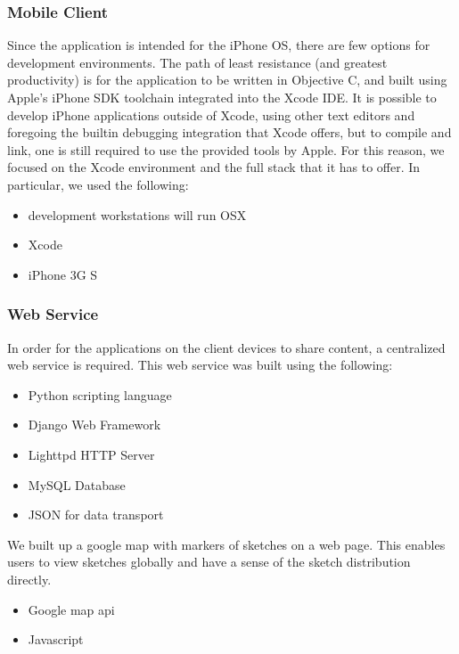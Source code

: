 \documentclass{chi2009}
\begin{document}
\subsubsection{Mobile Client}

Since the application is intended for the iPhone OS, there are few options for
development environments.  The path of least resistance (and greatest
productivity) is for the application to be written in Objective C, and built
using Apple's iPhone SDK toolchain integrated into the Xcode IDE.  It is
possible to develop iPhone applications outside of Xcode, using other text
editors and foregoing the builtin debugging integration that Xcode offers, but
to compile and link, one is still required to use the provided tools by Apple.
For this reason, we focused on the Xcode environment and the full
stack that it has to offer.  In particular, we used the following:

\begin{itemize}
\item development workstations will run OSX
\item Xcode
\item iPhone 3G S
\end{itemize}

\subsubsection{Web Service}

In order for the applications on the client devices to share content, a
centralized web service is required. This web service was built using the following:

\begin{itemize}
\item Python scripting language
\item Django Web Framework
\item Lighttpd HTTP Server
\item MySQL Database
\item JSON for data transport
\end{itemize}

We built up a google map with markers of sketches on a web page. This enables
users to view sketches globally and have a sense of the sketch distribution
directly.

\begin{itemize}
\item Google map api
\item Javascript
\end{itemize}
\end{document}

